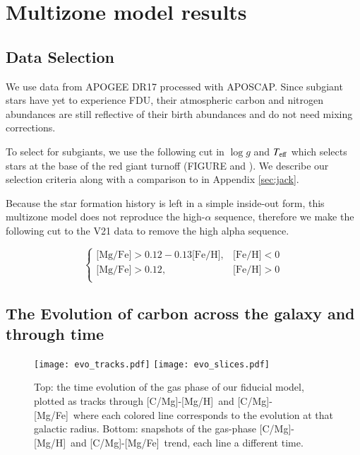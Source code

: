 \documentclass[12pt,oneside]{report}
\newcommand{\caah}{[C/Mg]-[Mg/H]}
\newcommand{\caafe}{[C/Mg]-[Mg/Fe]}
\begin{document}
\chapter{Multizone model results}
\section{Data Selection}

We use data from APOGEE DR17 \citep{apogee17} processed with APOSCAP. Since subgiant stars have yet to experience FDU, their atmospheric carbon and nitrogen abundances are still reflective of their birth abundances and do not need mixing corrections. 

To select for subgiants, we use the following cut in $\log g$ and $T_{\rm eff}$
which selects stars at the base of the red giant turnoff (FIGURE and
\cite{jack_subgiant}). We describe our selection criteria along with a 
comparison to \citet{fiorenzo+21} in Appendix \ref{sec:jack}. 

Because the star formation history is left in a simple inside-out form, this multizone model does not reproduce the high-$\alpha$ sequence, therefore we make the following cut to the V21 data to remove the high alpha sequence.

\begin{equation}\label{eq:high_alpha}
\begin{cases}
\text{[Mg/Fe]} >0.12-0.13\text{[Fe/H]}, & \text{[Fe/H]}<0\\
\text{[Mg/Fe]} >0.12, & \text{[Fe/H]}>0\\
\end{cases}
\end{equation}




\section{The Evolution of carbon across the galaxy and through time}

\begin{figure}
\centering
\texttt{[image: evo\_tracks.pdf]}
\texttt{[image: evo\_slices.pdf]}
\caption[Carbon chemical evolution tracks]{Top: the time evolution of the gas phase of our
    fiducial model, plotted as tracks through \caah~and \caafe~where each colored line corresponds to the evolution at that galactic radius. 
    Bottom: snapshots of the gas-phase \caah~and \caafe~trend, each line a different time.
}
\label{fig:c_evo}
\end{figure}
\end{document}

